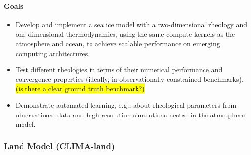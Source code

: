 \documentclass{article}
\begin{document}
\paragraph{Goals}
\begin{itemize}
    \item Develop and implement a sea ice model with a two-dimensional rheology and one-dimensional thermodynamics, using the same compute kernels as the atmosphere and ocean, to achieve scalable performance on emerging computing architectures. 
    \item Test different rheologies in terms of their numerical performance and convergence properties (ideally, in observationally constrained benchmarks). \hl{(is there a clear ground truth benchmark?)}
    \item Demonstrate automated learning, e.g., about rheological parameters from observational data and high-resolution simulations nested in the atmosphere model.
 \end{itemize}

\subsubsection{Land Model (CLIMA-land)}
\end{document}
